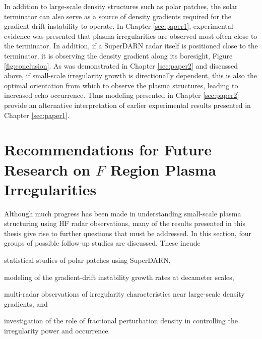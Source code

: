 In addition to large-scale density structures such as polar patches, the solar terminator can also serve as a source of density gradients required for the gradient-drift instability to operate.  In Chapter \ref{sec:paper1}, experimental evidence was presented that plasma irregularities are observed most often close to the terminator.  In addition, if a SuperDARN radar itself is positioned close to the terminator, it is observing the density gradient along its boresight, Figure \ref{fig:conclusion}.  As was demonstrated in Chapter \ref{sec:paper2} and discussed above, if small-scale irregularity growth is directionally dependent, this is also the optimal orientation from which to observe the plasma structures, leading to increased echo occurrence.  Thus modeling presented in Chapter \ref{sec:paper2} provide an alternative interpretation of earlier experimental results presented in Chapter \ref{sec:paper1}.


\section{Recommendations for Future Research on \(F\) Region Plasma Irregularities}
\label{sec:futurework}

Although much progress has been made in understanding small-scale plasma structuring using HF radar observations, many of the results presented in this thesis give rise to further questions that must be addressed.  In this section, four groups of possible follow-up studies are discussed.  These incude 
\begin{enumerate*}[label={(\arabic*)}] 
	\item statistical studies of polar patches using SuperDARN, 
	\item modeling of the gradient-drift instability growth rates at decameter scales, 
	\item multi-radar observations of irregularity characteristics near large-scale density gradients, and 
	\item investigation of the role of fractional perturbation density in controlling the irregularity power and occurrence.
\end{enumerate*}

